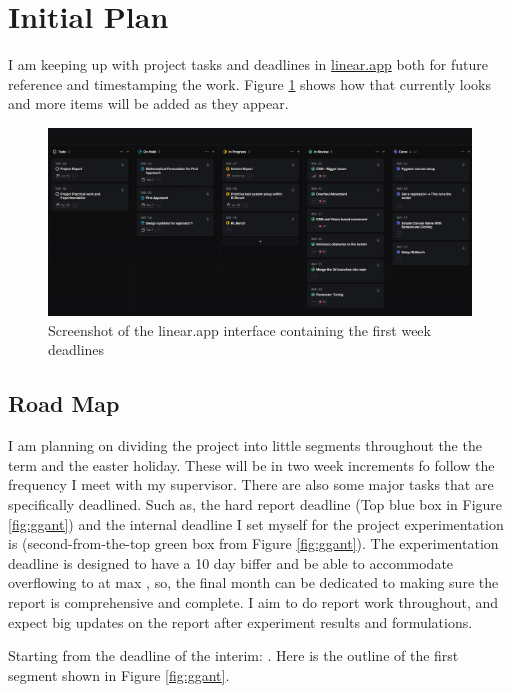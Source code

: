 \section{Initial Plan}
I am keeping up with project tasks and deadlines in \href{https://linear.app}{linear.app} both for future reference and timestamping the work. Figure \ref{fig:linear} shows how that currently looks and more items will be added as they appear.

\begin{figure}[h]
  \centering
  \includegraphics[width=\textwidth]{assets/initial-plan/initial-linear.png}
  \caption{Screenshot of the linear.app interface containing the first week deadlines}
  \label{fig:linear}
\end{figure}



\subsection{Road Map}
I am planning on dividing the project into little segments throughout the the term and the easter holiday. These will be in two week increments fo follow the frequency I meet with my supervisor. There are also some major tasks that are specifically deadlined. Such as, the hard report deadline  (Top blue box in Figure \ref{fig:ggant}) and the internal deadline I set myself for the project experimentation is  (second-from-the-top green box from Figure \ref{fig:ggant}). 
The experimentation deadline is designed to have a 10 day biffer and be able to accommodate overflowing to at max , so, the final month can be dedicated to making sure the report is comprehensive and complete. I aim to do report work throughout, and expect big updates on the report after experiment results and formulations.

Starting from the deadline of the interim: . Here is the outline of the first segment shown in Figure \ref{fig:ggant}.

